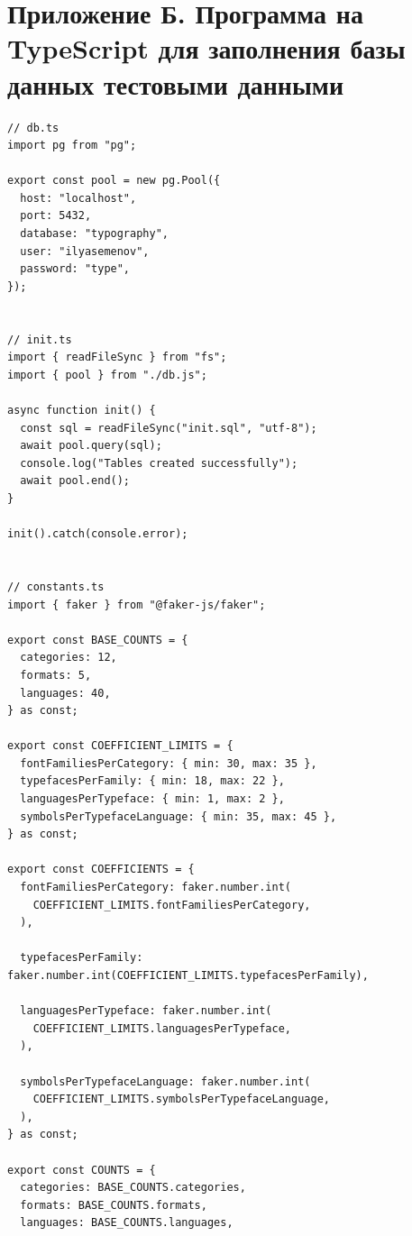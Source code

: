\section*{Приложение Б. Программа на TypeScript для заполнения базы данных тестовыми данными}
\label{app:seed-ts}

\renewcommand{\theFancyVerbLine}{%
    \scriptsize\ttfamily\textcolor{gray}{\arabic{FancyVerbLine}}%
}

\begin{verbatim}
// db.ts
import pg from "pg";

export const pool = new pg.Pool({
  host: "localhost",
  port: 5432,
  database: "typography",
  user: "ilyasemenov",
  password: "type",
});


// init.ts
import { readFileSync } from "fs";
import { pool } from "./db.js";

async function init() {
  const sql = readFileSync("init.sql", "utf-8");
  await pool.query(sql);
  console.log("Tables created successfully");
  await pool.end();
}

init().catch(console.error);


// constants.ts
import { faker } from "@faker-js/faker";

export const BASE_COUNTS = {
  categories: 12,
  formats: 5,
  languages: 40,
} as const;

export const COEFFICIENT_LIMITS = {
  fontFamiliesPerCategory: { min: 30, max: 35 },
  typefacesPerFamily: { min: 18, max: 22 },
  languagesPerTypeface: { min: 1, max: 2 },
  symbolsPerTypefaceLanguage: { min: 35, max: 45 },
} as const;

export const COEFFICIENTS = {
  fontFamiliesPerCategory: faker.number.int(
    COEFFICIENT_LIMITS.fontFamiliesPerCategory,
  ),

  typefacesPerFamily: faker.number.int(COEFFICIENT_LIMITS.typefacesPerFamily),

  languagesPerTypeface: faker.number.int(
    COEFFICIENT_LIMITS.languagesPerTypeface,
  ),

  symbolsPerTypefaceLanguage: faker.number.int(
    COEFFICIENT_LIMITS.symbolsPerTypefaceLanguage,
  ),
} as const;

export const COUNTS = {
  categories: BASE_COUNTS.categories,
  formats: BASE_COUNTS.formats,
  languages: BASE_COUNTS.languages,


\end{verbatim}
